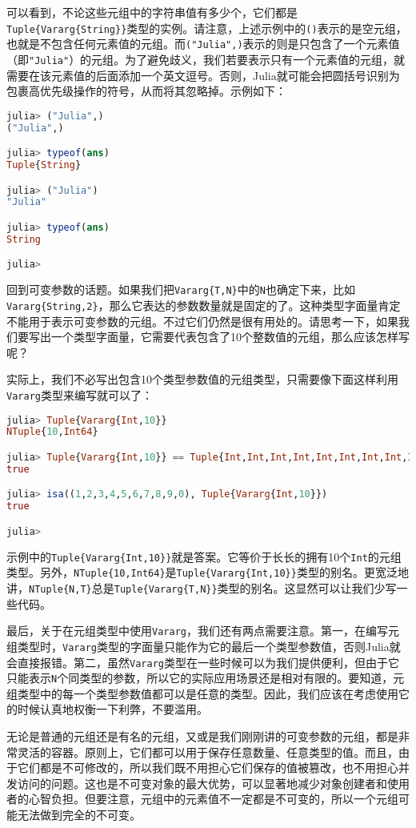可以看到，不论这些元组中的字符串值有多少个，它们都是\verb|Tuple{Vararg{String}}|类型的实例。请注意，上述示例中的\verb|()|表示的是空元组，也就是不包含任何元素值的元组。而\verb|("Julia",)|表示的则是只包含了一个元素值（即\verb|"Julia"|）的元组。为了避免歧义，我们若要表示只有一个元素值的元组，就需要在该元素值的后面添加一个英文逗号。否则，Julia就可能会把圆括号识别为包裹高优先级操作的符号，从而将其忽略掉。示例如下：
\begin{lstlisting}[language=julia]
julia> ("Julia",)
("Julia",)

julia> typeof(ans)
Tuple{String}

julia> ("Julia")
"Julia"

julia> typeof(ans)
String

julia> 
\end{lstlisting}

回到可变参数的话题。如果我们把\verb|Vararg{T,N}|中的\verb|N|也确定下来，比如\verb|Vararg{String,2}|，那么它表达的参数数量就是固定的了。这种类型字面量肯定不能用于表示可变参数的元组。不过它们仍然是很有用处的。请思考一下，如果我们要写出一个类型字面量，它需要代表包含了10个整数值的元组，那么应该怎样写呢？

实际上，我们不必写出包含10个类型参数值的元组类型，只需要像下面这样利用\verb|Vararg|类型来编写就可以了：
\begin{lstlisting}[language=julia]
julia> Tuple{Vararg{Int,10}}
NTuple{10,Int64}

julia> Tuple{Vararg{Int,10}} == Tuple{Int,Int,Int,Int,Int,Int,Int,Int,Int,Int}
true

julia> isa((1,2,3,4,5,6,7,8,9,0), Tuple{Vararg{Int,10}})
true

julia> 
\end{lstlisting}

示例中的\verb|Tuple{Vararg{Int,10}}|就是答案。它等价于长长的拥有10个\verb|Int|的元组类型。另外，\verb|NTuple{10,Int64}|是\verb|Tuple{Vararg{Int,10}}|类型的别名。更宽泛地讲，\verb|NTuple{N,T}|总是\verb|Tuple{Vararg{T,N}}|类型的别名。这显然可以让我们少写一些代码。

最后，关于在元组类型中使用\verb|Vararg|，我们还有两点需要注意。第一，在编写元组类型时，\verb|Vararg|类型的字面量只能作为它的最后一个类型参数值，否则Julia就会直接报错。第二，虽然\verb|Vararg|类型在一些时候可以为我们提供便利，但由于它只能表示\verb|N|个同类型的参数，所以它的实际应用场景还是相对有限的。要知道，元组类型中的每一个类型参数值都可以是任意的类型。因此，我们应该在考虑使用它的时候认真地权衡一下利弊，不要滥用。

无论是普通的元组还是有名的元组，又或是我们刚刚讲的可变参数的元组，都是非常灵活的容器。原则上，它们都可以用于保存任意数量、任意类型的值。而且，由于它们都是不可修改的，所以我们既不用担心它们保存的值被篡改，也不用担心并发访问的问题。这也是不可变对象的最大优势，可以显著地减少对象创建者和使用者的心智负担。但要注意，元组中的元素值不一定都是不可变的，所以一个元组可能无法做到完全的不可变。
